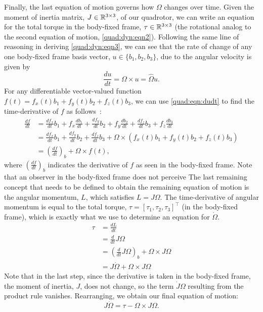 Finally, the last equation of motion governs how $\Omega$ changes over time. Given the moment of inertia matrix, $J \in \mathbb{R}^{3 \times 3}$, of our quadrotor, we can write an equation for the total torque in the body-fixed frame, $\tau \in \mathbb{R}^{3 \times 3}$ (the rotational analog to the second equation of motion, \autoref{quad:dyn:eqn2}). Following the same line of reasoning in deriving \autoref{quad:dyn:eqn3}, we can see that the rate of change of any one body-fixed frame basis vector, $u \in \{b_1, b_2, b_3\}$, due to the angular velocity is given by
\begin{equation}
    \frac{du}{dt} = \Omega \times u = \hat \Omega u.\label{quad:eqn:dudt}
\end{equation}
For any differentiable vector-valued function $f(t) = f_x(t)b_1 + f_y(t)b_2 + f_z(t)b_3$, we can use \autoref{quad:eqn:dudt} to find the time-derivative of $f$ as follows~\cite{Lanczos1986}:
\begin{align*}
    \frac{df}{dt} &= \frac{df_x}{dt}b_1 + f_x\frac{db_1}{dt}
                    +\frac{df_y}{dt}b_2 + f_y\frac{db_2}{dt}
                    +\frac{df_z}{dt}b_3 + f_z\frac{db_3}{dt} \\
                  &= \frac{df_x}{dt}b_1 + \frac{df_y}{dt}b_2 + \frac{df_z}{dt}b_3
                    +\Omega \times (f_x(t) b_1 + f_y(t) b_2 + f_z(t) b_3) \\
                  &= {\left( \frac{df}{dt} \right)}_b + \Omega \times f(t),
\end{align*}
where ${\left( \frac{df}{dt} \right)}_b$ indicates the derivative of $f$ as seen in the body-fixed frame. Note that an observer in the body-fixed frame does not perceive
The last remaining concept that needs to be defined to obtain the remaining equation of motion is the angular momentum, $L$, which satisfies $L = J\Omega$. The time-derivative of angular momentum is equal to the total torque, $\tau = {[\tau_1, \tau_2, \tau_3]}^\top$ (in the body-fixed frame), which is exactly what we use to determine an equation for $\dot \Omega$.
\begin{align*}
\tau &= \frac{dL}{dt} \\
     &= \frac{d}{dt} J\Omega \\
     &= {\left( \frac{d}{dt} J\Omega \right)}_b + \Omega \times J\Omega \\
     &= J\dot\Omega + \Omega \times J\Omega
\end{align*}
Note that in the last step, since the derivative is taken in the body-fixed frame, the moment of inertia, $J$, does not change, so the term $\dot J\Omega$ resulting from the product rule vanishes. Rearranging, we obtain our final equation of motion:
\begin{equation}
 J\dot \Omega = \tau - \Omega \times J\Omega. \label{quad:dyn:eqn4}
\end{equation}

